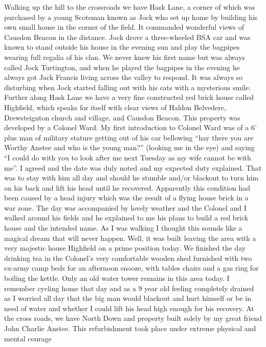 
Walking up the hill to the crossroads we have Hask Lane, a corner of which was
purchased by a young Scotsman known as Jock who set up home by building his own
small house in the corner of the field. It commanded wonderful views of Causdon
Beacon in the distance. Jock drove a three-wheeled BSA car and was known to
stand outside his house in the evening sun and play the bagpipes wearing full
regalia of his clan. We never knew his first name but was always called Jock
Turtington, and when he played the bagpipes in the evening he always got Jack
Francis living across the valley to respond. It was always so disturbing when
Jock started falling out with his cats with a mysterious smile. Further along
Hask Lane we have a very fine constructed red brick house called Highfield,
which speaks for itself with clear views of Haldon Belvedere, Drewsteignton
church and village, and Causdon Beacon. This property was developed by a Colonel
Ward. My first introduction to Colonel Ward was of a 6' plus man of military
stature getting out of his car bellowing ``hay there you are Worthy Anstee and
who is the young man?'' (looking me in the eye) and saying ``I could do with you to
look after me next Tuesday as my wife cannot be with me''. I agreed and the
date was duly noted and my expected duty explained. That was to stay with him
all day and should he stumble and/or blackout to turn him on his back and lift
his head until he recovered. Apparently this condition had been caused by a
head injury which was the result of a flying house brick in a war zone. The day
was accompanied by lovely weather and the Colonel and I walked around his
fields and he explained to me his plans to build a red brick house and the
intended name. As I was walking I thought this sounds like a magical dream that
will never happen. Well, it was built leaving the area with a very majestic
house Highfield on a prime position today. We finished the day drinking tea in
the Colonel’s very comfortable wooden shed furnished with two ex-army camp beds
for an afternoon snooze, with tables chairs and a gas ring for boiling the
kettle. Only an old water tower remains in this area today. I remember cycling
home that day and as a 9 year old feeling completely drained as I worried all
day that the big man would blackout and hurt himself or be in need of water and
whether I could lift his head high enough for his recovery. At the cross roads,
we have North Down and property built solely by my great friend John Charlie
Anstee. This refurbishment took place under extreme physical and mental courage
